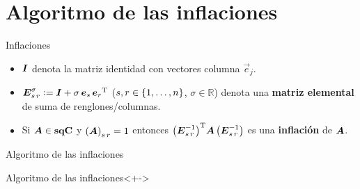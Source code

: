 \documentclass[spanish]{beamer}
\begin{document}
\section{Algoritmo de las inflaciones}
\begin{frame}{Inflaciones}
  \begin{definitions}
    \begin{itemize}[<+->]
      \item $\boldsymbol{I}$ denota la matriz identidad con vectores columna 
      $\vec{e}_j$.
      \item $\boldsymbol{E}_{{s} \, {r}}^{\sigma} \mathrel{\mathop:}= \boldsymbol{I} + \sigma \, \boldsymbol{e}_s \, 
      {\boldsymbol{e}_r}^{\operatorname{T}}$ ($s, r \in \left\{{1, \ldots, n}\right\}$, $\sigma \in 
      \mathbb{R}$) denota una \textbf{matriz elemental} de suma de renglones/columnas.
      \item Si $\boldsymbol{A} \in \mathbf{sqC}$ y $\left({\boldsymbol{A}}\right)_{{s}\,{r}} = 1$ entonces 
      ${\left(\boldsymbol{E}_{{s} \, {r}}^{-1}\right)}^{\operatorname{T}} \boldsymbol{A} 
      \left(\boldsymbol{E}_{{s} \, {r}}^{-1}\right)$ es una \textbf{inflación} de $\boldsymbol{A}$.
    \end{itemize}
  \end{definitions}
\end{frame}

\begin{frame}{Algoritmo de las inflaciones}
  \begin{block}{Algoritmo de las inflaciones}<+->
    \begin{algorithm}[H]
    \end{algorithm}
  \end{block}
\end{frame}
\end{document}
